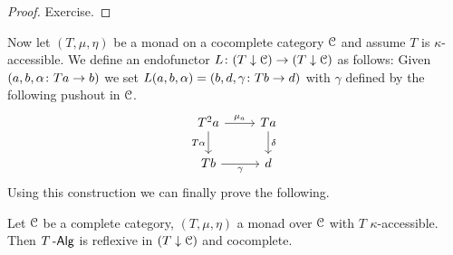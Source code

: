 \documentclass[a4paper,11pt,oneside,openany]{scrbook}
\begin{document}
\begin{proof}
    Exercise.
\end{proof}
Now let $ (T,\mu,\eta) $ be a monad on a cocomplete category $ \operatorname{\mathcal{C}} $ and assume $ T $ is $ \kappa $-accessible.
We define an endofunctor $ L \colon (T\downarrow\operatorname{\mathcal{C}}) \to (T\downarrow\operatorname{\mathcal{C}}) $ as follows:
Given $ (a,b,\alpha\colon Ta \to b) $ we set $ L(a,b,\alpha) = (b,d,\gamma \colon Tb \to d) $ with $ \gamma $ defined by
the following pushout in $ \operatorname{\mathcal{C}} $.
\begin{displaymath}
    \begin{tikzcd}
	T^2 a \arrow[r, "\mu_a"]\arrow[d, "T\alpha"'] &  Ta \arrow[d, "\delta"]\\
	Tb \arrow[r,"\gamma"'] & d
    \end{tikzcd}
\end{displaymath}
Using this construction we can finally prove the following.
\begin{thm}
    Let $\operatorname{\mathcal{C}}$ be a complete category, $(T,\mu,\eta)$ a monad over $\operatorname{\mathcal{C}}$ with $T$ $\kappa$-accessible. Then $T\operatorname{-\mathsf{Alg}}$ is reflexive in $(T\downarrow\operatorname{\mathcal{C}})$ and cocomplete.
\end{thm}
\end{document}

